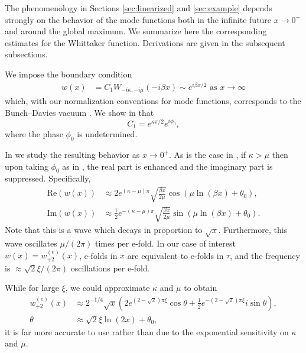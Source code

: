 The phenomenology in Sections \ref{sec:linearized} and \ref{sec:example} depends strongly on the behavior of the mode functions both in the infinite future $x\to0^{+}$ and around the global maximum. We summarize here the corresponding estimates for the Whittaker function. Derivations are given in the subsequent subsections.

We impose the boundary condition 
\begin{align}
w(x) & =C_{1}W_{-i\kappa,-i\mu}(-i\beta x)\sim e^{i\beta x/2}\textrm{ as }x\to\infty\label{eq:whittaker-with-coeff}
\end{align}
 which, with our normalization conventions for mode functions, corresponds to the Bunch--Davies vacuum . We show in  that 
\[
C_{1}=e^{\kappa\pi/2}e^{i\phi_{0}},
\]
 where the phase $\phi_{0}$ is undetermined. 

In  we study the resulting behavior as $x\to0^{+}$. As is the case in , if $\kappa>\mu$ then upon taking $\phi_{0}$ as in , the real part is enhanced and the imaginary part is suppressed. Specifically, 
\begin{align}
\textrm{Re}(w(x)) & \approx2e^{(\kappa-\mu)\pi}\sqrt{\frac{\beta x}{2\mu}}\cos\left(\mu\ln(\beta x)+\theta_{0}\right),\label{eq:wh-re}\\
\textrm{Im}(w(x)) & \approx\tfrac{1}{2}e^{-(\kappa-\mu)\pi}\sqrt{\frac{\beta x}{2\mu}}\sin\left(\mu\ln(\beta x)+\theta_{0}\right).\label{eq:wh-im}
\end{align}
 Note that this is a wave which decays in proportion to $\sqrt{x}$. Furthermore, this wave oscillates $\mu/(2\pi)$ times per e-fold. In our case of interest $w(x)=w_{+2}^{(e)}(x)$, e-folds in $x$ are equivalent to e-folds in $\tau$, and the frequency is $\approx\sqrt{2}\xi/(2\pi)$ oscillations per e-fold. 

While for large $\xi$, we could approximate $\kappa$ and $\mu$ to obtain 
\begin{align}
w_{+2}^{(e)}(x) & \approx2^{-1/4}\sqrt{x}\left(2e^{(2-\sqrt{2})\pi\xi}\cos\theta+\tfrac{1}{2}e^{-(2-\sqrt{2})\pi\xi}i\sin\theta\right),\label{eq:as_wp2}\\
\theta & \approx\sqrt{2}\xi\ln(2x)+\theta_{0},\nonumber 
\end{align}
 it is far more accurate to use  rather than  due to the exponential sensitivity on $\kappa$ and $\mu$. 

